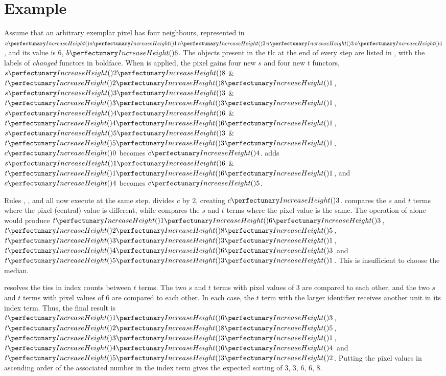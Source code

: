 
\section{\label{sec:median:cpsmedianexample} Example}

Assume that an arbitrary exemplar pixel has four neighbours, represented in \(\cpfunc{a}{\cpfunc{n}{1} \, \cpfunc{n}{2} \, \cpfunc{n}{3} \, \cpfunc{n}{4}}\), and its value is 6, \(\cpfunc{b}{6}\).  The objects present in the \gls{tlc} at the end of every step are listed in , with the labels of \emph{changed} \glspl{functor} in boldface.  When  is applied, the pixel gains four new \(s\) and four new \(t\) \glspl{functor}, \(\cpfuncn{s}{2}{8}\) \& \(\cpfuncnn{t}{2}{8}{1}\), \(\cpfuncn{s}{3}{3}\) \& \(\cpfuncnn{t}{3}{3}{1}\), \(\cpfuncn{s}{4}{6}\) \& \(\cpfuncnn{t}{4}{6}{1}\), \(\cpfuncn{s}{5}{3}\) \& \(\cpfuncnn{t}{5}{3}{1}\).  \(\cpfunc{c}{0}\) becomes \(\cpfunc{c}{4}\).   adds \(\cpfuncn{s}{1}{6}\) \& \(\cpfuncnn{t}{1}{6}{1}\), and \(\cpfunc{c}{4}\) becomes \(\cpfunc{c}{5}\).

Rules , , and  all now execute at the same step.   divides \(c\) by 2, creating \(\cpfunc{c}{3}\).   compares the \(s\) and \(t\) terms where the pixel (central) value is different, while  compares the \(s\) and \(t\) terms where the pixel value is the same.  The operation of  alone would produce \(\cpfuncnn{t}{1}{6}{3}\), \(\cpfuncnn{t}{2}{8}{5}\), \(\cpfuncnn{t}{3}{3}{1}\), \(\cpfuncnn{t}{4}{6}{3}\) and \(\cpfuncnn{t}{5}{3}{1}\).  This is insufficient to choose the median.

 resolves the ties in index counts between \(t\) terms.  The two \(s\) and \(t\) terms with pixel values of 3 are compared to each other, and the two \(s\) and \(t\) terms with pixel values of 6 are compared to each other.  In each case, the \(t\) term with the larger identifier receives another unit in its index term.  Thus, the final result is \(\cpfuncnn{t}{1}{6}{3}\), \(\cpfuncnn{t}{2}{8}{5}\), \(\cpfuncnn{t}{3}{3}{1}\), \(\cpfuncnn{t}{4}{6}{4}\) and \(\cpfuncnn{t}{5}{3}{2}\).  Putting the pixel values in ascending order of the associated number in the index term gives the expected sorting of 3, 3, 6, 6, 8.


